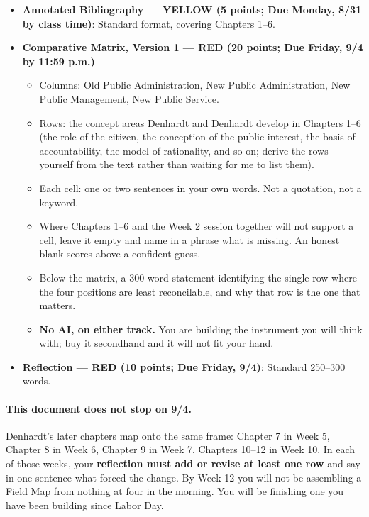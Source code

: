 \documentclass[11pt]{article}     %
\begin{document}
\begin{itemize}
    \item \textbf{Annotated Bibliography --- YELLOW (5 points; Due Monday, 8/31 by class time)}: Standard format, covering Chapters 1--6.

    \item \textbf{Comparative Matrix, Version 1 --- RED (20 points; Due Friday, 9/4 by 11:59 p.m.)}
    \begin{itemize}
        \item Columns: Old Public Administration, New Public Administration, New Public Management, New Public Service.
        \item Rows: the concept areas Denhardt and Denhardt develop in Chapters 1--6 (the role of the citizen, the conception of the public interest, the basis of accountability, the model of rationality, and so on; derive the rows yourself from the text rather than waiting for me to list them).
        \item Each cell: one or two sentences in your own words. Not a quotation, not a keyword.
        \item Where Chapters 1--6 and the Week 2 session together will not support a cell, leave it empty and name in a phrase what is missing. An honest blank scores above a confident guess.
        \item Below the matrix, a 300-word statement identifying the single row where the four positions are least reconcilable, and why that row is the one that matters.
        \item \textbf{No AI, on either track.} You are building the instrument you will think with; buy it secondhand and it will not fit your hand.
    \end{itemize}

    \item \textbf{Reflection --- RED (10 points; Due Friday, 9/4)}: Standard 250--300 words.
\end{itemize}

\paragraph*{This document does not stop on 9/4.} Denhardt's later chapters map onto the same frame: Chapter 7 in Week 5, Chapter 8 in Week 6, Chapter 9 in Week 7, Chapters 10--12 in Week 10. In each of those weeks, your \textbf{reflection must add or revise at least one row} and say in one sentence what forced the change. By Week 12 you will not be assembling a Field Map from nothing at four in the morning. You will be finishing one you have been building since Labor Day.
\end{document}
